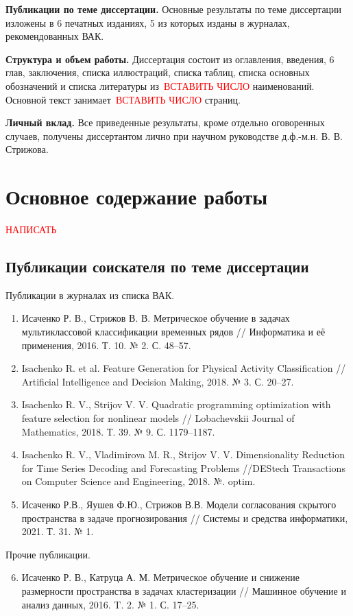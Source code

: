 \documentclass[11pt, a5paper]{dissert}
\begin{document}
\vspace{0.5cm}
\textbf{Публикации по теме диссертации.}
Основные результаты по теме диссертации изложены в 6 печатных изданиях, 5 из которых изданы в журналах, рекомендованных ВАК.

\vspace{0.5cm}
\textbf{Структура и объем работы.}
Диссертация состоит из оглавления, введения, 6 глав, заключения, списка иллюстраций, списка таблиц, списка основных обозначений и списка литературы из~\textcolor{red}{ВСТАВИТЬ ЧИСЛО} наименований. 
Основной текст занимает~\textcolor{red}{ВСТАВИТЬ ЧИСЛО} страниц.

\vspace{0.5cm}
\textbf{Личный вклад.}
Все приведенные результаты, кроме отдельно оговоренных случаев, получены диссертантом лично при научном руководстве д.ф.-м.н. В. В. Стрижова.

\section*{Основное содержание работы}

\textcolor{red}{НАПИСАТЬ}

\subsection*{Публикации соискателя по теме диссертации}
Публикации в журналах из списка ВАК.
\vspace{0.3cm}
\begin{enumerate}
	\item Исаченко Р. В., Стрижов В. В. Метрическое обучение в задачах мультиклассовой классификации временных рядов // Информатика и её применения, 2016. Т. 10. № 2. С. 48--57.
	\item Isachenko R. et al. Feature Generation for Physical Activity Classification // Artificial Intelligence and Decision Making, 2018. № 3. С. 20--27.
	\item Isachenko R. V., Strijov V. V. Quadratic programming optimization with feature selection for nonlinear models // Lobachevskii Journal of Mathematics, 2018. Т. 39. № 9. С. 1179--1187.
	\item Isachenko R. V., Vladimirova M. R., Strijov V. V. Dimensionality Reduction for Time Series Decoding and Forecasting Problems //DEStech Transactions on Computer Science and Engineering, 2018. №. optim.
	\item Исаченко Р.В., Яушев Ф.Ю., Стрижов В.В. Модели согласования скрытого пространства в задаче прогнозирования // Системы и средства информатики, 2021. Т. 31. № 1.
\end{enumerate}

\vspace{0.4cm}
{Прочие публикации.}
\vspace{0.2cm}
\begin{enumerate}
\setcounter{enumi}{5}
	\item Исаченко Р. В., Катруца А. М. Метрическое обучение и снижение размерности пространства в задачах кластеризации // Машинное обучение и анализ данных, 2016. T. 2. № 1. С. 17--25.
\end{enumerate}
\end{document}
